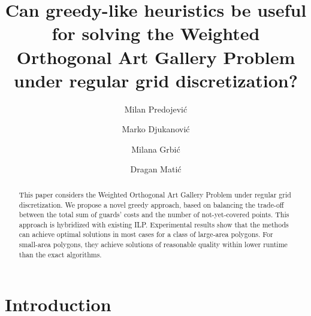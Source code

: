 \documentclass[runningheads,a4paper]{elsarticle}
\begin{document}
	
	
	\title{Can greedy-like heuristics be useful for solving the Weighted Orthogonal Art Gallery Problem under regular grid discretization?}
	
	\author[1]{Milan Predojevi\'c}
\author[1]{Marko Djukanovi\'c}
\author[1]{Milana Grbi\'c}
\author[1]{Dragan Mati\'c}
    \address[1]{Faculty of Natural Science and Mathematics, University of Banja Luka, Bosnia and Herzegovina}

	\begin{abstract}
This paper considers the Weighted Orthogonal Art Gallery Problem under regular grid discretization. We propose a novel greedy approach, based on balancing the trade-off between the total sum of guards' costs and the number of not-yet-covered points. This approach is hybridized with existing ILP. Experimental results show that the methods can achieve optimal solutions in most cases for a class of large-area polygons. For small-area polygons, they achieve solutions of reasonable quality within lower runtime than the exact algorithms.
	\end{abstract}
	\maketitle
	
	
	\section{Introduction}\label{sec:introduction}
	
\end{document}

